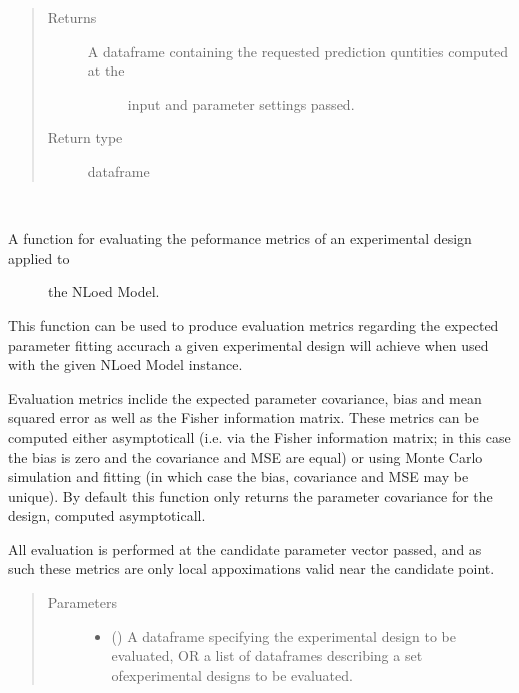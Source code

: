 \documentclass[letterpaper,10pt,english,openany,oneside]{sphinxmanual}
\begin{document}
\begin{fulllineitems}
\begin{fulllineitems}
\begin{quote}
\begin{description}
\item[{Returns}] \leavevmode
\begin{description}
\item[{A dataframe containing the requested prediction quntities computed at the}] \leavevmode
input and parameter settings passed.

\end{description}


\item[{Return type}] \leavevmode
dataframe

\end{description}\end{quote}

\end{fulllineitems}


\begin{fulllineitems}
\label{\detokenize{nloed:nloed.model.Model.evaluate}}~\begin{description}
\item[{A function for evaluating the peformance metrics of an experimental design applied to}] \leavevmode
the NLoed Model.

\end{description}

This function can be used to produce evaluation metrics regarding the expected parameter
fitting accurach a given experimental design will achieve when used with the given NLoed
Model instance.

Evaluation metrics inclide the expected parameter covariance, bias and mean
squared error as well as the Fisher information matrix. These metrics can be computed either
asymptoticall (i.e. via the Fisher information matrix; in this case the bias is zero and the
covariance and MSE are equal) or using Monte Carlo simulation and fitting (in which case the
bias, covariance and MSE may be unique). By default this function only returns the parameter
covariance for the design, computed asymptoticall.

All evaluation is performed at the candidate parameter vector passed, and as such these
metrics are only local appoximations valid near the candidate point.
\begin{quote}\begin{description}
\item[{Parameters}] \leavevmode\begin{itemize}
\item {} 
 () \textendash{} A dataframe specifying the experimental design
to be evaluated,
OR a list of dataframes describing a set ofexperimental designs to be evaluated.


\end{itemize}
\end{description}
\end{quote}
\end{fulllineitems}
\end{fulllineitems}
\end{document}
